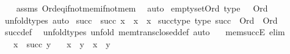 \begin{isabellebody}
%
\isadelimproof
\ \ %
\endisadelimproof
%
\isatagproof
{}\isamarkupfalse%
\ assms\ Ord{\isacharunderscore}{\kern0pt}eq{\isacharunderscore}{\kern0pt}if{\isacharunderscore}{\kern0pt}not{\isacharunderscore}{\kern0pt}mem{\isacharunderscore}{\kern0pt}if{\isacharunderscore}{\kern0pt}not{\isacharunderscore}{\kern0pt}mem\ \isamarkupfalse%
\ auto%
\endisatagproof
{\isafoldproof}%
%
\isadelimproof
\isanewline
%
\endisadelimproof
\isanewline
{}\isamarkupfalse%
\ emptyset{\isacharunderscore}{\kern0pt}Ord\ {\isacharbrackleft}{\kern0pt}type{\isacharbrackright}{\kern0pt}{\isacharcolon}{\kern0pt}\ {\isachardoublequoteopen}{\isacharbraceleft}{\kern0pt}{\isacharbraceright}{\kern0pt}\ {\isacharcolon}{\kern0pt}\ Ord{\isachardoublequoteclose}\isanewline
%
\isadelimproof
\ \ %
\endisadelimproof
%
\isatagproof
{}\isamarkupfalse%
\ unfold{\isacharunderscore}{\kern0pt}types\ auto%
\endisatagproof
{\isafoldproof}%
%
\isadelimproof
%
\endisadelimproof
%
\isadelimdocument
%
\endisadelimdocument
%
\isatagdocument
%
\isamarkuptrue%
%
\endisatagdocument
{\isafolddocument}%
%
\isadelimdocument
%
\endisadelimdocument
{}\isamarkupfalse%
\ succ\ \ {\isachardoublequoteopen}succ\ x\ {\isasymequiv}\ x\ {\isasymunion}\ {\isacharbraceleft}{\kern0pt}x{\isacharbraceright}{\kern0pt}{\isachardoublequoteclose}\isanewline
\isanewline
{}\isamarkupfalse%
\ succ{\isacharunderscore}{\kern0pt}type\ {\isacharbrackleft}{\kern0pt}type{\isacharbrackright}{\kern0pt}{\isacharcolon}{\kern0pt}\ {\isachardoublequoteopen}succ\ {\isacharcolon}{\kern0pt}\ Ord\ {\isasymRightarrow}\ Ord{\isachardoublequoteclose}\isanewline
%
\isadelimproof
\ \ %
\endisadelimproof
%
\isatagproof
{}\isamarkupfalse%
\ succ{\isacharunderscore}{\kern0pt}def\ \isamarkupfalse%
\ unfold{\isacharunderscore}{\kern0pt}types\ {\isacharparenleft}{\kern0pt}unfold\ mem{\isacharunderscore}{\kern0pt}trans{\isacharunderscore}{\kern0pt}closed{\isacharunderscore}{\kern0pt}def{\isacharcomma}{\kern0pt}\ auto\ {}\ {}{\isacharparenright}{\kern0pt}%
\endisatagproof
{\isafoldproof}%
%
\isadelimproof
\isanewline
%
\endisadelimproof
\isanewline
{}\isamarkupfalse%
\ mem{\isacharunderscore}{\kern0pt}succE\ {\isacharbrackleft}{\kern0pt}elim{\isacharbrackright}{\kern0pt}{\isacharcolon}{\kern0pt}\isanewline
\ \ \ {\isachardoublequoteopen}x\ {\isasymin}\ succ\ y{\isachardoublequoteclose}\isanewline
\ \ \ {\isachardoublequoteopen}x\ {\isasymin}\ y{\isachardoublequoteclose}\ {\isacharbar}{\kern0pt}\ {\isachardoublequoteopen}x\ {\isacharequal}{\kern0pt}\ y{\isachardoublequoteclose}\isanewline

\end{isabellebody}
